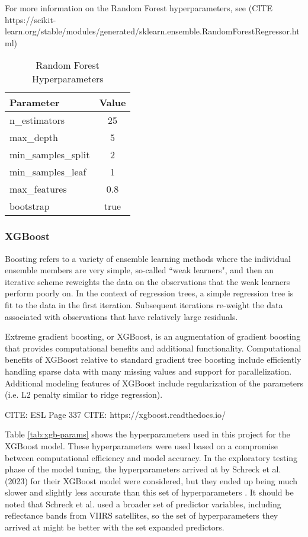 For more information on the Random Forest hyperparameters, see (CITE https://scikit-learn.org/stable/modules/generated/sklearn.ensemble.RandomForestRegressor.html)

\begin{table}[ht]
\centering
\begin{tabular}{|l|c|}
\hline
\textbf{Parameter} & \textbf{Value} \\
\hline
n\_estimators & 25 \\
max\_depth & 5 \\
min\_samples\_split & 2 \\
min\_samples\_leaf & 1 \\
max\_features & 0.8 \\
bootstrap & true \\
\hline
\end{tabular}
\caption{Random Forest Hyperparameters}
\label{tab:rf-params}
\end{table}


\subsubsection*{XGBoost}

Boosting refers to a variety of ensemble learning methods where the individual ensemble members are very simple, so-called ``weak learners", and then an iterative scheme reweights the data on the observations that the weak learners perform poorly on. In the context of regression trees, a simple regression tree is fit to the data in the first iteration. Subsequent iterations re-weight the data associated with observations that have relatively large residuals. 

Extreme gradient boosting, or XGBoost, is an augmentation of gradient boosting that provides computational benefits and additional functionality. Computational benefits of XGBoost relative to standard gradient tree boosting include efficiently handling sparse data with many missing values and support for parallelization. Additional modeling features of XGBoost include regularization of the parameters (i.e. L2 penalty similar to ridge regression).

CITE: ESL Page 337
CITE: https://xgboost.readthedocs.io/

Table \ref{tab:xgb-params} shows the hyperparameters used in this project for the XGBoost model. These hyperparameters were used based on a compromise between computational efficiency and model accuracy. In the exploratory testing phase of the model tuning, the hyperparameters arrived at by Schreck et al. (2023) for their XGBoost model were considered, but they ended up being much slower and slightly less accurate than this set of hyperparameters \cite{Schreck-2023-MLV}. It should be noted that Schreck et al. used a broader set of predictor variables, including reflectance bands from VIIRS satellites, so the set of hyperparameters they arrived at might be better with the set expanded predictors. 

